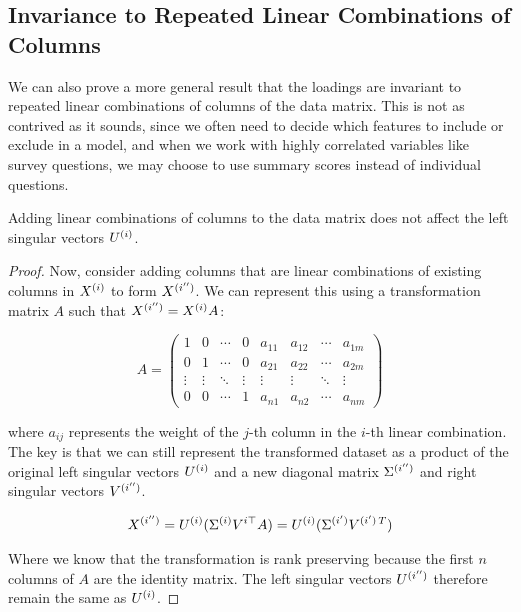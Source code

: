 \subsection{Invariance to Repeated Linear Combinations of Columns}\label{subsubsec:invariance-to-linear-combinations}

We can also prove a more general result that the \gls{loadings} are invariant to repeated linear combinations of columns of the data matrix.
This is not as contrived as it sounds, since we often need to decide which features to include or exclude in a model, and when we work with highly correlated variables like survey questions, we may choose to use summary scores instead of individual questions.

\begin{lemma}
    Adding linear combinations of columns to the data matrix does not affect the left singular vectors $U^{(i)}$.
\end{lemma}

\begin{proof}
    Now, consider adding columns that are linear combinations of existing columns in \( X^{(i)} \) to form \( X^{(i'')} \).
    We can represent this using a transformation matrix \( A \) such that \( X^{(i'')} = X^{(i)}A \):

    \begin{equation}
        A = \begin{pmatrix}
                1      & 0      & \cdots & 0      & a_{11} & a_{12} & \cdots & a_{1m} \\
                0      & 1      & \cdots & 0      & a_{21} & a_{22} & \cdots & a_{2m} \\
                \vdots & \vdots & \ddots & \vdots & \vdots & \vdots & \ddots & \vdots \\
                0      & 0      & \cdots & 1      & a_{n1} & a_{n2} & \cdots & a_{nm}
        \end{pmatrix}
    \end{equation}

    where \( a_{ij} \) represents the weight of the \( j \)-th column in the \( i \)-th linear combination.
    The key is that we can still represent the transformed dataset as a product of the original left singular vectors \( U^{(i)} \) and a new diagonal matrix \( \Sigma^{(i'')} \) and right singular vectors \( V^{(i'')} \).

    \begin{align}
        X^{(i'')} = U^{(i)}(\Sigma^{(i)}V^{i\top}A) = U^{(i)}(\Sigma^{(i')}V^{(i')\,T})  \label{eq:svd_linear_combinations}
    \end{align}

    Where we know that the transformation is rank preserving because the first \( n \) columns of \( A \) are the identity matrix.
    The left singular vectors \( U^{(i'')} \) therefore remain the same as \( U^{(i)} \).
\end{proof}

